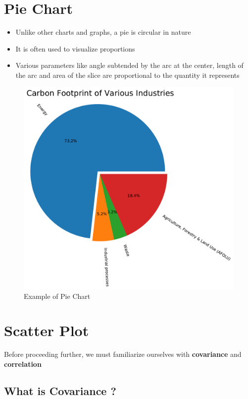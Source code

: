 \documentclass[twoside,12pt]{report}  %
\begin{document}
\pagebreak

\section{Pie Chart}
\begin{itemize}
	\item Unlike other charts and graphs, a pie is circular in nature
	\item It is often used to visualize proportions
	\item Various parameters like angle subtended by the arc at the center, length of the arc and area of the slice are proportional to the quantity it represents 
\end{itemize}

\begin{figure}[H]
	\centering
	\includegraphics[width=0.5\linewidth]{./images/piechart_example.pdf}
	\caption{Example of Pie Chart}
	\label{piechart_example}
\end{figure}

\vfill

\pagebreak

\section{Scatter Plot}

Before proceeding further, we must familiarize ourselves with \textbf{covariance} and \textbf{correlation}

\subsection{What is Covariance ?}
\end{document}
